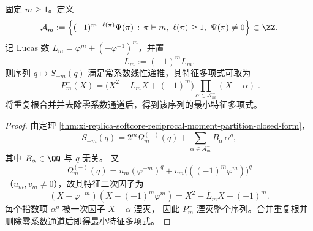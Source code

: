\begin{theorem}\label{thm:xi-replica-softcore-reciprocal-moment-q-recurrence}
固定 \(m\ge1\)。定义
\[
\mathcal A_m^{-}:=
\Bigl\{
(-1)^{m-\ell(\pi)}\Psi(\pi)\,:\,
\pi\vdash m,\ \ell(\pi)\ge1,\ \Psi(\pi)\neq0
\Bigr\}\subset\ZZ.
\]
记 Lucas 数 \(L_m=\varphi^m+(-\varphi^{-1})^m\)，并置
\[
\widetilde L_m:=(-1)^mL_m.
\]
则序列 \(q\mapsto S_{-m}(q)\) 满足常系数线性递推，其特征多项式可取为
\[
\boxed{\;
P_m^{-}(X)=\bigl(X^2-\widetilde L_m X+(-1)^m\bigr)
\prod_{\alpha\in\mathcal A_m^{-}}(X-\alpha)\; }.
\]
将重复根合并并去除零系数通道后，得到该序列的最小特征多项式。
\end{theorem}
\begin{proof}
由定理 \ref{thm:xi-replica-softcore-reciprocal-moment-partition-closed-form}，
\[
S_{-m}(q)=2^m\Omega_m^{(-)}(q)+\sum_{\alpha\in\mathcal A_m^{-}}B_\alpha\,\alpha^q,
\]
其中 \(B_\alpha\in\QQ\) 与 \(q\) 无关。
又
\[
\Omega_m^{(-)}(q)
=u_m(\varphi^{-m})^q+v_m\bigl(((-1)^m\varphi^{m})\bigr)^q
\]
（\(u_m,v_m\neq0\)），故其特征二次因子为
\[
(X-\varphi^{-m})(X-(-1)^m\varphi^m)
=X^2-\widetilde L_m X+(-1)^m.
\]
每个指数项 \(\alpha^q\) 被一次因子 \(X-\alpha\) 湮灭，
因此 \(P_m^{-}\) 湮灭整个序列。合并重复根并删除零系数通道后即得最小特征多项式。
\end{proof}

